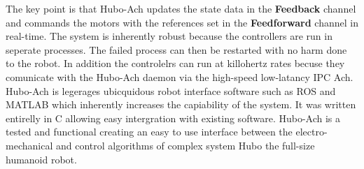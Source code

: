 The key point is that Hubo-Ach updates the state data in the \textbf{Feedback} channel and commands the motors with the references set in the \textbf{Feedforward} channel in real-time.  
The system is inherently robust because the controllers are run in seperate processes.
The failed process can then be restarted with no harm done to the robot.
In addition the controlelrs can run at killohertz rates becuse they comunicate with the Hubo-Ach daemon via the high-speed low-latancy IPC Ach.
Hubo-Ach is legerages ubicquidous robot interface software such as ROS and MATLAB which inherently increases the capiability of the system.
It was written entirelly in C allowing easy intergration with existing software.
Hubo-Ach is a tested and functional creating an easy to use interface between the electro-mechanical and control algorithms of complex system Hubo the full-size humanoid robot.


